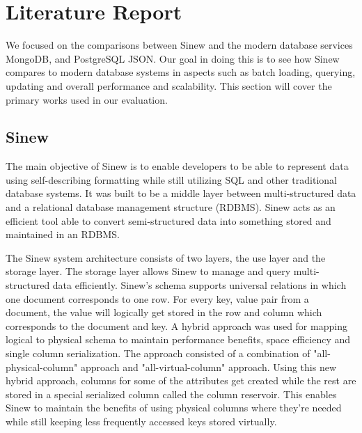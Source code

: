 \documentclass[sigconf]{acmart}
\begin{document}

\maketitle

\section{Literature Report}
   We focused on the comparisons between Sinew and the modern database services MongoDB, and PostgreSQL JSON. Our goal in doing this is to see how Sinew compares to modern database systems in aspects such as batch loading, querying, updating and overall performance and scalability. This section will cover the primary works used in our evaluation.

   \subsection{Sinew}

   The main objective of Sinew \cite{Tahara_Diamond_Abadi_2014} is to enable developers to be able to represent data using self-describing formatting while still utilizing SQL and other traditional database systems. It was built to be a middle layer between multi-structured data and a relational database management structure (RDBMS). Sinew acts as an efficient tool able to convert semi-structured data into something stored and maintained in an RDBMS.

   The Sinew system architecture consists of two layers, the use layer and the storage layer. The storage layer allows Sinew to manage and query multi-structured data efficiently. Sinew's schema supports universal relations in which one document corresponds to one row. For every key, value pair from a document, the value will logically get stored in the row and column which corresponds to the document and key. A hybrid approach was used for mapping logical to physical schema to maintain performance benefits, space efficiency and single column serialization. The approach consisted of a combination of "all-physical-column" approach and "all-virtual-column" approach. Using this new hybrid approach, columns for some of the attributes get created while the rest are stored in a special serialized column called the column reservoir. This enables Sinew to maintain the benefits of using physical columns where they're needed while still keeping less frequently accessed keys stored virtually.
\end{document}
